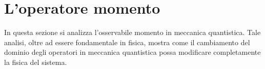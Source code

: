\documentclass[../../FisicaTeorica.tex]{subfiles}
\begin{document}
\begin{comment}
Svantaggi:
	1) \phi_A non è unico, non è \q{canonico} (mentre una famiglia spettrale è unica). 
	2) La scrittura \int d\lambda \ket{\lambda}\bra{\lambda} è matematicamente imprecisa e la sua formalizzazione rigorosa richiede una matematica sofisticata (es. \q{nuclearità})
	3) Se \left\langle\lambda\right|\notin \mathcal{H}^\prime≈H non rappresenta uno stato fisico (es. nel caso di un'onda piana e^{\frac{i}{\hbar}px}\notin L^2. Ma lì p=h/\lambda, e \nu =\frac{E}{h}, \lambda\nu =\frac{E}{p}=\frac{mc^2}{mv\gamma}=\frac{c^2}{v}>c. De Broglie considerò allora un pacchetto d'onde, con \int f_{p_0}\left(p\right)e^{\frac{i}{\hbar}px}dp\in L^2, purché f_{p_0}\in L^2(R, dp), dove f_{p_0} è una funzione \q{piccata} su un punto p_0. Ma allora in questo caso \frac{d\omega}{dk}=\frac{d\mathcal{E}}{dp}=v. Tuttavia, fisicamente si preferisce lavorare con l'onda piana - per semplicità - e nel caso vengano risultati infiniti si considerano le ipotesi di pacchetto d'onda), ma Dirac lo tratta analogamente agli altri stati (nel 99\% di volte produrrà conti giusti, ma ci sono circostanti in cui si giunge ad assurdità)
	4) Quando scrivete la completezza per X:
	\int dx \left|x\right\rangle\left\langle x\right|=I
	Assomiglia ad una \q{versione continua} del caso di una base \left\{|\lambda_n\ket\right\} ON, per cui H sembra non separabile, ma sappiamo che lo è:
	\sum_{n}{\left|\lambda_n\right\rangle\left\langle\lambda_n\right|=\mathbb{I}}
	
	Tuttavia tale relazione è comunque giusta (il formalismo di Dirac funziona, ma \q{va interpretato} nei suoi risultati)
\end{comment}






\section{L'operatore momento}
In questa sezione si analizza l'osservabile momento in meccanica quantistica. Tale analisi, oltre ad essere fondamentale in fisica, mostra come il cambiamento del dominio degli operatori in meccanica quantistica possa modificare completamente la fisica del sistema.
\end{document}
